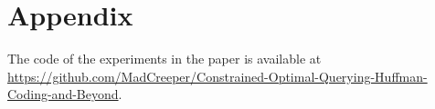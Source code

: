 \newpage %
\section*{Appendix} %

The code of the experiments in the paper is available at  \url{https://github.com/MadCreeper/Constrained-Optimal-Querying-Huffman-Coding-and-Beyond}.